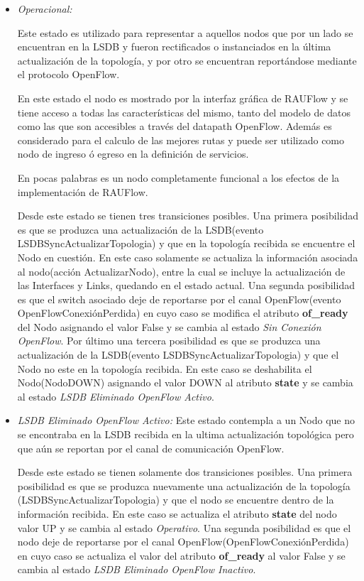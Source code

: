 \begin{itemize}
\item \textit{Operacional:}

Este estado es utilizado para representar a aquellos nodos que por un lado se encuentran en la LSDB y fueron rectificados o instanciados en la \'ultima actualizaci\'on de la topolog\'ia, y por otro se encuentran report\'andose mediante el protocolo OpenFlow.

En este estado el nodo es mostrado por la interfaz gr\'afica de RAUFlow y se tiene acceso a todas las características del mismo, tanto del modelo de datos como las que son accesibles a trav\'es del datapath OpenFlow. Adem\'as es considerado para el calculo de las mejores rutas y puede ser utilizado como nodo de ingreso \'o egreso en la definici\'on de servicios.

En pocas palabras es un nodo completamente funcional a los efectos de la implementaci\'on de RAUFlow.

Desde este estado se tienen tres transiciones posibles. Una primera posibilidad es que se produzca una actualización de la LSDB(evento LSDBSyncActualizarTopologia) y que en la topolog\'ia recibida se encuentre el Nodo en cuesti\'on. En este caso solamente se actualiza la informaci\'on asociada al nodo(acción ActualizarNodo), entre la cual se incluye la actualización de las Interfaces y Links, quedando en el estado actual. Una segunda posibilidad es que el switch asociado deje de reportarse por el canal OpenFlow(evento OpenFlowConexiónPerdida) en cuyo caso se modifica el atributo \textbf{of\_ready} del Nodo asignando el valor False y se cambia al estado \textit{Sin Conexión OpenFlow}. Por \'ultimo una tercera posibilidad es que se produzca una actualizaci\'on de la LSDB(evento LSDBSyncActualizarTopologia) y que el Nodo no este en la topolog\'ia recibida. En este caso se deshabilita el Nodo(NodoDOWN) asignando el valor DOWN al atributo \textbf{state} y se cambia al estado \textit{LSDB Eliminado OpenFlow Activo}.

\item \textit{LSDB Eliminado OpenFlow Activo:} Este estado contempla a un Nodo que no se encontraba en la LSDB recibida en la ultima actualizaci\'on topol\'ogica pero que a\'un se reportan por el canal de comunicaci\'on OpenFlow.

Desde este estado se tienen solamente dos transiciones posibles. Una primera posibilidad es que se produzca nuevamente una actualización de la topolog\'ia 
(LSDBSyncActualizarTopologia) y que el nodo se encuentre dentro de la información recibida. En este caso se actualiza el atributo \textbf{state} del nodo valor UP y se cambia al estado \textit{Operativo}. Una segunda posibilidad es que el nodo deje de reportarse por el canal OpenFlow(OpenFlowConexiónPerdida) en cuyo caso se actualiza el valor del atributo \textbf{of\_ready} al valor False y se cambia al estado \textit{LSDB Eliminado OpenFlow Inactivo}.


\end{itemize}
